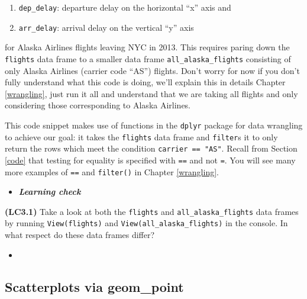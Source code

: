 \documentclass[12pt,]{krantz}
\makeatletter
\newenvironment{Shaded}{\begin{snugshade}}{\end{snugshade}}
\newcommand{\KeywordTok}[1]{\textcolor[rgb]{0.27,0.27,0.27}{\textbf{#1}}}
\newcommand{\StringTok}[1]{\textcolor[rgb]{0.5,0.5,0.5}{#1}}
\newcommand{\OperatorTok}[1]{\textcolor[rgb]{0.43,0.43,0.43}{\textbf{#1}}}
\newcommand{\NormalTok}[1]{#1}
\providecommand{\tightlist}{%
  \setlength{\itemsep}{0pt}\setlength{\parskip}{0pt}}
\newenvironment{kframe}{%
\medskip{}
\setlength{\fboxsep}{.8em}
 \def\at@end@of@kframe{}%
 \ifinner\ifhmode%
  \def\at@end@of@kframe{\end{minipage}}%
  \begin{minipage}{\columnwidth}%
 \fi\fi%
 \def\FrameCommand##1{\hskip\@totalleftmargin \hskip-\fboxsep
 \colorbox{shadecolor}{##1}\hskip-\fboxsep
     \hskip-\linewidth \hskip-\@totalleftmargin \hskip\columnwidth}%
 \MakeFramed {\advance\hsize-\width
   \@totalleftmargin\z@ \linewidth\hsize
   \@setminipage}}%
 {\par\unskip\endMakeFramed%
 \at@end@of@kframe}
\renewenvironment{Shaded}{\begin{kframe}}{\end{kframe}}
\newenvironment{rmdblock}[1]
  {\begin{shaded*}
  \begin{itemize}
  \renewcommand{\labelitemi}{
    \raisebox{-.7\height}[0pt][0pt]{
    }
  }
  \item
  }
  {
  \end{itemize}
  \end{shaded*}
  }
\newenvironment{learncheck}
  {\begin{rmdblock}{warning}}
  {\end{rmdblock}}
\makeatother
\begin{document}
\begin{enumerate}
\def\labelenumi{\arabic{enumi}.}
\tightlist
\item
  \texttt{dep\_delay}: departure delay on the horizontal ``x'' axis and
\item
  \texttt{arr\_delay}: arrival delay on the vertical ``y'' axis
\end{enumerate}

for Alaska Airlines flights leaving NYC in 2013. This requires paring
down the \texttt{flights} data frame to a smaller data frame
\texttt{all\_alaska\_flights} consisting of only Alaska Airlines
(carrier code ``AS'') flights. Don't worry for now if you don't fully
understand what this code is doing, we'll explain this in details
Chapter \ref{wrangling}, just run it all and understand that we are
taking all flights and only considering those corresponding to Alaska
Airlines.

\begin{Shaded}
\end{Shaded}

This code snippet makes use of functions in the \texttt{dplyr} package
for data wrangling to achieve our goal: it takes the \texttt{flights}
data frame and \texttt{filter}s it to only return the rows which meet
the condition \texttt{carrier\ ==\ "AS"}. Recall from Section \ref{code}
that testing for equality is specified with \texttt{==} and not
\texttt{=}. You will see many more examples of \texttt{==} and
\texttt{filter()} in Chapter \ref{wrangling}.

\begin{learncheck}
\textbf{\emph{Learning check}}
\end{learncheck}

\textbf{(LC3.1)} Take a look at both the \texttt{flights} and
\texttt{all\_alaska\_flights} data frames by running
\texttt{View(flights)} and \texttt{View(all\_alaska\_flights)} in the
console. In what respect do these data frames differ?

\begin{learncheck}

\end{learncheck}

\subsection{Scatterplots via geom\_point}\label{geompoint}
\end{document}
